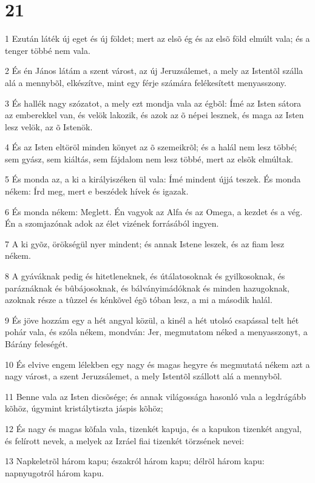 \chapter{21}

\par 1 Ezután láték új eget és új földet; mert az elsõ ég és az elsõ föld elmúlt vala; és a tenger többé nem vala.
\par 2 És én János látám a szent várost, az új Jeruzsálemet, a mely az Istentõl szálla alá a mennybõl, elkészítve, mint egy férje számára  felékesített menyasszony.
\par 3 És hallék nagy szózatot, a mely ezt mondja vala az égbõl: Ímé az Isten sátora az emberekkel van, és velök lakozik, és azok az õ népei lesznek, és maga az Isten lesz velök, az õ Istenök.
\par 4 És az Isten eltöröl minden könyet az õ szemeikrõl; és a halál  nem lesz többé; sem gyász, sem kiáltás, sem fájdalom nem lesz többé, mert az elsõk elmúltak.
\par 5 És monda az, a ki a királyiszéken ül vala: Ímé mindent újjá  teszek. És monda nékem: Írd meg, mert e beszédek hívek és igazak.
\par 6 És monda nékem: Meglett. Én vagyok az Alfa  és az Omega, a kezdet és a vég. Én a szomjazónak adok az élet  vizének forrásából ingyen.
\par 7 A ki gyõz, örökségül nyer mindent; és annak Istene leszek, és az fiam lesz nékem.
\par 8 A gyáváknak pedig és hitetleneknek, és útálatosoknak és gyilkosoknak, és paráznáknak és bûbájosoknak, és bálványimádóknak és minden hazugoknak, azoknak része a tûzzel és kénkõvel égõ tóban lesz, a mi a második  halál.
\par 9 És jöve hozzám egy a hét angyal közül, a kinél a hét utolsó csapással telt hét pohár vala, és szóla nékem, mondván: Jer, megmutatom néked a menyasszonyt, a  Bárány feleségét.
\par 10 És elvive engem lélekben egy nagy és magas hegyre és megmutatá nékem azt a nagy várost, a szent Jeruzsálemet, a mely Istentõl szállott alá a mennybõl.
\par 11 Benne vala az Isten dicsõsége; és annak világossága hasonló vala a legdrágább kõhöz, úgymint kristálytiszta jáspis kõhöz;
\par 12 És nagy és magas kõfala vala, tizenkét kapuja, és a kapukon tizenkét angyal, és felírott nevek, a melyek az Izráel fiai tizenkét törzsének nevei:
\par 13 Napkeletrõl három kapu; északról három kapu; délrõl három kapu: napnyugotról három kapu.

